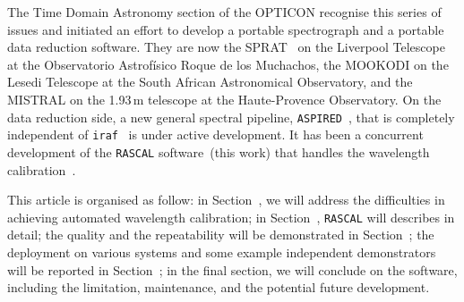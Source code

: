\documentclass[fleqn,usenatbib]{rasti}
\begin{document}
The Time Domain Astronomy section of the OPTICON recognise this series of issues and
initiated an effort to develop a portable spectrograph and a portable data reduction
software. They are now the SPRAT~\citep{2014SPIE.9147E..8HP} on the Liverpool
Telescope~\citep{2004SPIE.5489..679S} at the Observatorio Astrof{\'i}sico Roque de los
Muchachos, the MOOKODI on the Lesedi Telescope 
at the South African Astronomical Observatory, and the MISTRAL on the 1.93\,m
telescope at the Haute-Provence Observatory. On the data reduction side, a new
general spectral pipeline, \texttt{ASPIRED}~\citep{2021arXiv211102127L, 2020zndo...4306065L},
that is completely independent of \texttt{iraf}~\citep{1986SPIE..627..733T} is under
active development. It has been a concurrent development
of the \texttt{RASCAL} software~(this work) that handles the wavelength
calibration~\citep{2019arXiv191205883V, 2020zndo...4117517V}.

This article is organised as follow: in Section~, we will address
the difficulties in achieving automated wavelength calibration; in Section~,
\texttt{RASCAL} will describes in detail; the quality and the repeatability will
be demonstrated in Section~; the deployment on various systems and some example
independent demonstrators will be reported in Section~; in the final section, we
will conclude on the software, including the limitation, maintenance, and the potential
future development.
\end{document}
